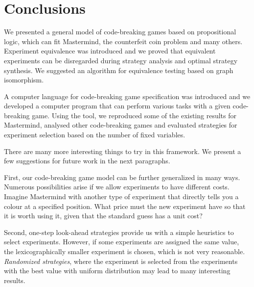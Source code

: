 \chapter{Conclusions} \label{ch:conclusions}
We presented a general model of code-breaking games based on propositional logic,
  which can fit Mastermind, the counterfeit coin problem and many others.
Experiment equivalence was introduced and we proved that
  equivalent experiments can be disregarded during strategy analysis and
  optimal strategy synthesis.
We suggested an algorithm for equivalence
  testing based on graph isomorphism.

A computer language for code-breaking game specification was introduced
  and we developed a computer program that can perform various tasks
  with a given code-breaking game.
Using the tool, we reproduced some of the existing results for Mastermind,
  analysed other code-breaking games and
  evaluated strategies for experiment selection
  based on the number of fixed variables.

There are many more interesting things to try in this framework.
We present a few suggestions for future work in the next paragraphs.

First, our code-breaking game model can be further generalized in many ways.
Numerous possibilities arise if we allow experiments to have different costs.
Imagine Mastermind with another type of experiment
  that directly tells you a colour at a specified position.
What price must the new experiment have so that
  it is worth using it, given that the standard guess has a unit cost?


Second, one-step look-ahead strategies provide us with
  a simple heuristics to select experiments.
However, if some experiments are assigned the same value, the
  lexicographically smaller experiment is chosen,
  which is not very reasonable.
\emph{Randomized strategies},
  where the experiment is selected from the experiments
  with the best value with uniform distribution
  may lead to many interesting results.

